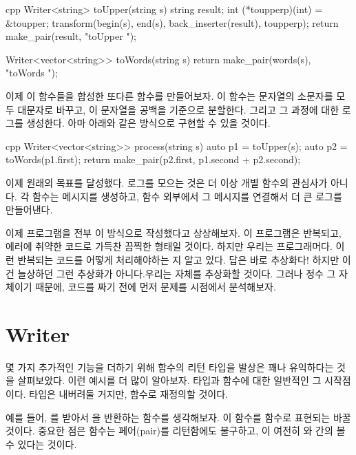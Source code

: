 \begin{snip}{cpp}
Writer<string> toUpper(string s) {
    string result;
    int (*toupperp)(int) = &toupper;
    transform(begin(s), end(s), back_inserter(result), toupperp);
    return make_pair(result, "toUpper "); 
}

Writer<vector<string>> toWords(string s) { 
    return make_pair(words(s), "toWords ");
}
\end{snip}
이제 이 함수들을 합성한 또다른  함수를 만들어보자. 이 함수는 문자열의 소문자를 모두 대문자로 바꾸고, 이 문자열을 공백을 기준으로 분할한다. 그리고 그 과정에 대한 로그를 생성한다.
아마 아래와 같은 방식으로 구현할 수 있을 것이다.

\begin{snip}{cpp}
Writer<vector<string>> process(string s) {
    auto p1 = toUpper(s);
    auto p2 = toWords(p1.first);
    return make_pair(p2.first, p1.second + p2.second);
}
\end{snip}
이제 원래의 목표를 달성했다. 로그를 모으는 것은 더 이상 개별 함수의 관심사가 아니다. 각 함수는 메시지를 생성하고, 함수 외부에서 그 메시지를 연결해서 더 큰 로그를 만들어낸다.

이제 프로그램을 전부 이 방식으로 작성했다고 상상해보자. 이 프로그램은 반복되고, 에러에 취약한 코드로 가득찬 끔찍한 형태일 것이다. 하지만 우리는 프로그래머다.
이런 반복되는 코드를 어떻게 처리해야하는 지 알고 있다. 답은 바로 추상화다!
하지만 이건 늘상하던 그런 추상화가 아니다.우리는  자체를 추상화할 것이다.
그러나   정수 그 자체이기 때문에, 코드를 짜기 전에 먼저 문제를  시점에서 분석해보자.

\section{Writer \trCategory}

몇 가지 추가적인 기능을 더하기 위해 함수의 리턴 타입을  발상은 꽤나 유익하다는 것을 살펴보았다.
이런 예시를 더 많이 알아보자. 타입과 함수에 대한 일반적인  그 시작점이다. 타입은  내버려둘 거지만,   함수로 재정의할 것이다.

예를 들어,  를 받아서 을 반환하는  함수를  생각해보자. 이 함수를  함수로 표현되는  바꿀 것이다.
중요한 점은  함수는 페어(pair)를 리턴함에도 불구하고, 이  여전히  와  \trObject 간의  볼 수 있다는 것이다. 

